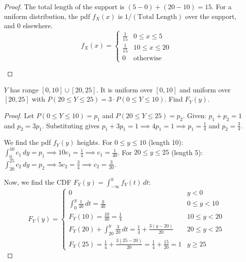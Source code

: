 \begin{proof}
The total length of the support is $(5 - 0) + (20 - 10) = 15$.
For a uniform distribution, the pdf $f_X(x)$ is $1/(\text{Total Length})$ over the support, and $0$ elsewhere.
\[
f_X(x) = \begin{cases}
\frac{1}{15} & 0 \leq x \leq 5 \\
\frac{1}{15} & 10 \leq x \leq 20 \\
0 & \text{otherwise}
\end{cases}
\]

\begin{center}
\end{center}
\end{proof}

\begin{exercise}
$Y$ has range $[0,10] \cup [20,25]$. It is uniform over $[0,10]$ and uniform over $[20,25]$ with $P(20 \leq Y \leq 25) = 3 \cdot P(0 \leq Y \leq 10)$. Find $F_Y(y)$.
\end{exercise}

\begin{proof}
Let $P(0 \leq Y \leq 10) = p_1$ and $P(20 \leq Y \leq 25) = p_2$.
Given: $p_1 + p_2 = 1$ and $p_2 = 3p_1$.
Substituting gives $p_1 + 3p_1 = 1 \implies 4p_1 = 1 \implies p_1 = \frac{1}{4}$ and $p_2 = \frac{3}{4}$.

We find the pdf $f_Y(y)$ heights.
For $0 \leq y \leq 10$ (length 10): $\int_0^{10} c_1 \, dy = p_1 \implies 10 c_1 = \frac{1}{4} \implies c_1 = \frac{1}{40}$.
For $20 \leq y \leq 25$ (length 5): $\int_{20}^{25} c_2 \, dy = p_2 \implies 5 c_2 = \frac{3}{4} \implies c_2 = \frac{3}{20}$.

Now, we find the CDF $F_Y(y) = \int_{-\infty}^y f_Y(t) \, dt$:
\[
F_Y(y) = \begin{cases}
0 & y < 0 \\
\int_0^y \frac{1}{40} \, dt = \frac{y}{40} & 0 \leq y < 10 \\
F_Y(10) = \frac{10}{40} = \frac{1}{4} & 10 \leq y < 20 \\
F_Y(20) + \int_{20}^y \frac{3}{20} \, dt = \frac{1}{4} + \frac{3(y-20)}{20} & 20 \leq y < 25 \\
F_Y(25) = \frac{1}{4} + \frac{3(25-20)}{20} = \frac{1}{4} + \frac{15}{20} = 1 & y \geq 25
\end{cases}
\]
\end{proof}

